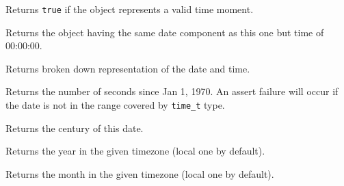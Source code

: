 

\label{wxdatetimeisvalid}


Returns {\tt true} if the object represents a valid time moment.


\label{wxdatetimegetdateonly}


Returns the object having the same date component as this one but time of
00:00:00.





\label{wxdatetimegettm}


Returns broken down representation of the date and time.


\label{wxdatetimegetticks}


Returns the number of seconds since Jan 1, 1970. An assert failure will occur
if the date is not in the range covered by {\tt time\_t} type.


\label{wxdatetimegetcentury}


Returns the century of this date.


\label{wxdatetimegetyear}


Returns the year in the given timezone (local one by default).


\label{wxdatetimegetmonth}


Returns the month in the given timezone (local one by default).


\label{wxdatetimegetday}

